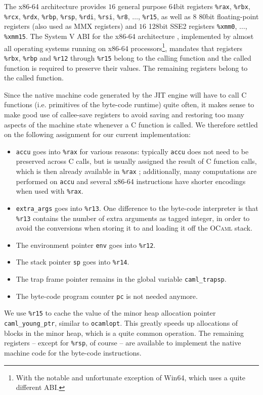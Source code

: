 \documentclass[10pt,a4paper,twocolumn]{article}
\begin{document}
The x86-64 architecture \cite{Amd09Vol1,Intel10Vol1} provides $16$ general purpose 64bit registers \texttt{\%rax},
\texttt{\%rbx}, \texttt{\%rcx}, \texttt{\%rdx}, \texttt{\%rbp}, \texttt{\%rsp}, \texttt{\%rdi}, \texttt{\%rsi},
\texttt{\%r8}, $\ldots$, \texttt{\%r15}, as well as $8$ 80bit floating-point registers (also used
as MMX registers) and $16$ 128bit SSE2 registers \texttt{\%xmm0}, $\ldots$, \texttt{\%xmm15}.
The System V ABI for the x86-64 architecture \cite{Matz10}, implemented by almost all operating
systems running on x86-64 processors\footnote{With the notable and unfortunate exception of
Win64, which uses a quite different ABI.}, mandates that registers \texttt{\%rbx}, \texttt{\%rbp}
and \texttt{\%r12} through \texttt{\%r15} belong to the calling function and the called function is 
required to preserve their values. The remaining registers belong to the called function.

Since the native machine code generated by the JIT engine will have to call C functions (i.e.
primitives of the byte-code runtime) quite often, it makes sense to make good use of callee-save
registers to avoid saving and restoring too many aspects of the machine state whenever a C function
is called. We therefore settled on the following assignment for our current implementation:
\begin{itemize}
\item \texttt{accu} goes into \texttt{\%rax} for various reasons: typically \texttt{accu} does not
  need to be preserved across C calls, but is usually assigned the result of C function calls, which
  is then already available in \texttt{\%rax} \cite{Matz10}; additionally, many computations are performed on
  \texttt{accu} and several x86-64 instructions have shorter encodings when used with \texttt{\%rax}.
\item \texttt{extra\_args} goes into \texttt{\%r13}. One difference to the byte-code interpreter
  is that \texttt{\%r13} contains the number of extra arguments as tagged integer, in order to
  avoid the conversions when storing it to and loading it off the \textsc{OCaml} stack.
\item The environment pointer \texttt{env} goes into \texttt{\%r12}.
\item The stack pointer \texttt{sp} goes into \texttt{\%r14}.
\item The trap frame pointer remains in the global variable \texttt{caml\_trapsp}.
\item The byte-code program counter \texttt{pc} is not needed anymore.
\end{itemize}
We use \texttt{\%r15} to cache the value of the minor heap allocation pointer \texttt{caml\_young\_ptr},
similar to \texttt{ocamlopt}. This greatly speeds up allocations of blocks in the minor heap,
which is a quite common operation. The remaining registers -- except for \texttt{\%rsp}, of course --
are available to implement the native machine code for the byte-code instructions.
\end{document}
